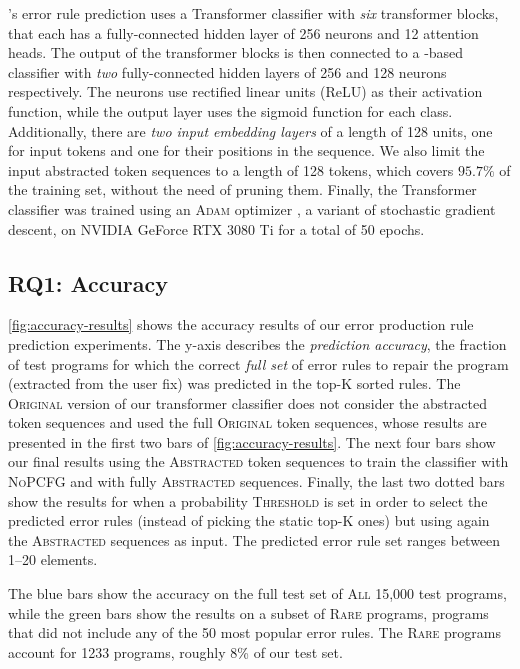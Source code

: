 \toolname's error rule prediction uses a Transformer classifier with \emph{six}
transformer blocks, that each has a fully-connected hidden layer of 256 neurons
and 12 attention heads. The output of the transformer blocks is then connected
to a \dnn-based classifier with \emph{two} fully-connected hidden layers of 256
and 128 neurons respectively. The neurons use rectified linear units (ReLU) as
their activation function, while the output layer uses the sigmoid function for
each class. Additionally, there are \emph{two input embedding layers} of a
length of 128 units, one for input tokens and one for their positions in the
sequence. We also limit the input abstracted token sequences to a length of 128
tokens, which covers $95.7\%$ of the training set, without the need of pruning
them. Finally, the Transformer classifier was trained using an \textsc{Adam}
optimizer \citep{Kingma2014-ng}, a variant of stochastic gradient descent, on
NVIDIA GeForce RTX 3080 Ti for a total of 50 epochs.

\subsection{RQ1: Accuracy}
\label{sec:eval:accuracy}



\autoref{fig:accuracy-results} shows the accuracy results of our error
production rule prediction experiments. The y-axis describes the
\emph{prediction accuracy}, \ie the fraction of test programs for which the
correct \emph{full set} of error rules to repair the program (extracted from
the user fix) was predicted in the top-K sorted rules.
%
The \textsc{Original} version of our transformer classifier does not consider
the abstracted token sequences and used the full \textsc{Original} token
sequences, whose results are presented in the first two bars of
\autoref{fig:accuracy-results}. The next four bars show our final results using
the \textsc{Abstracted} token sequences to train the classifier with
\textsc{NoPCFG} and with fully \textsc{Abstracted} sequences. Finally, the last
two dotted bars show the results for when a probability \textsc{Threshold} is
set in order to select the predicted error rules (instead of picking the static
top-K ones) but using again the \textsc{Abstracted} sequences as input. The
predicted error rule set ranges between 1--20 elements.

The blue bars show the accuracy on the full test set of \textsc{All} 15,000 test
programs, while the green bars show the results on a subset of \textsc{Rare}
programs, \ie programs that did not include any of the 50 most popular error
rules. The \textsc{Rare} programs account for 1233 programs, roughly 8\% of our
test set.

